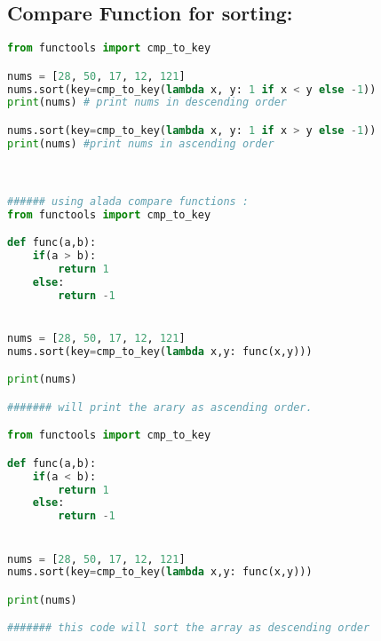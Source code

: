 \documentclass[12pt]{article}
\begin{document}
\subsection{Compare Function for sorting:}
\begin{lstlisting}[language=Python,tabsize=3]
from functools import cmp_to_key

nums = [28, 50, 17, 12, 121]
nums.sort(key=cmp_to_key(lambda x, y: 1 if x < y else -1))
print(nums) # print nums in descending order

nums.sort(key=cmp_to_key(lambda x, y: 1 if x > y else -1))
print(nums) #print nums in ascending order 



###### using alada compare functions : 
from functools import cmp_to_key

def func(a,b):
	if(a > b):
		return 1
	else:
		return -1


nums = [28, 50, 17, 12, 121]
nums.sort(key=cmp_to_key(lambda x,y: func(x,y)))

print(nums)

####### will print the arary as ascending order. 

from functools import cmp_to_key

def func(a,b):
	if(a < b):
		return 1
	else:
		return -1


nums = [28, 50, 17, 12, 121]
nums.sort(key=cmp_to_key(lambda x,y: func(x,y)))

print(nums)

####### this code will sort the array as descending order 

\end{lstlisting}
\end{document}
